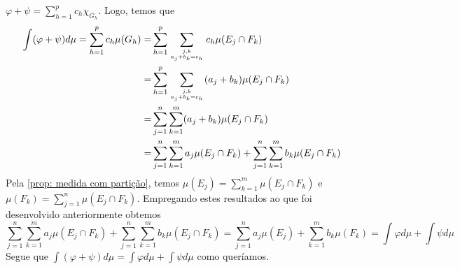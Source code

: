 \begin{prova}
    $\displaystyle \varphi + \psi = \sum_{h =1}^p c_h\chi_{G_h}$.
    Logo, temos que 
    \begin{align*}
        \int(\varphi + \psi) d\mu = \sum_{h =1}^p c_h\mu(G_h)
        = & 
        \sum_{h = 1}^p\sum_{ j,k\atop a_j + b_k = c_h}c_h \mu(E_j \cap F_k)\\
        = &
        \sum_{h = 1}^p\sum_{ j,k\atop a_j + b_k = c_h}(a_j + b_k) \mu(E_j \cap F_k)\\
        = &
        \sum_{j = 1}^n\sum_{k = 1}^m(a_j + b_k) \mu(E_j \cap F_k)\\
        = &
        \sum_{j = 1}^n\sum_{k = 1}^m a_j \mu(E_j \cap F_k) + \sum_{j = 1}^n\sum_{k = 1}^m b_k \mu(E_j \cap F_k)
    \end{align*}
	Pela \ref{prop: medida com partição}, temos
	$
	\displaystyle
	\mu(E_j) = \sum_{k = 1}^m \mu(E_j \cap F_k)
	$
    e
    $\displaystyle \mu(F_k) = \sum_{j = 1}^n \mu(E_j \cap F_k)$.
    Empregando estes resultados ao que foi desenvolvido anteriormente obtemos
    $$
    \sum_{j = 1}^n\sum_{k = 1}^m a_j \mu(E_j \cap F_k) + \sum_{j = 1}^n\sum_{k = 1}^m b_k \mu(E_j \cap F_k)
    =
    \sum_{j = 1}^n a_j \mu(E_j) + \sum_{k = 1}^m b_k \mu(F_k)
    =
    \int \varphi d\mu + \int \psi d\mu
    $$
    Segue que $\displaystyle\int(\varphi + \psi) d\mu = \int \varphi d\mu + \int \psi d\mu$ como queríamos.
\end{prova}



